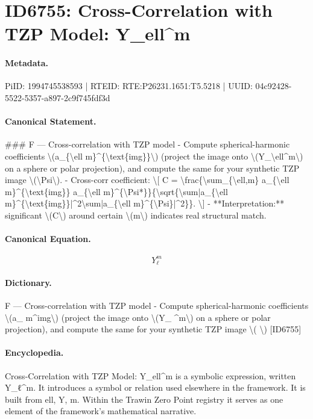 \section*{ID6755: Cross-Correlation with TZP Model: Y\_ell\textasciicircum{}m}
\paragraph{Metadata.}
PiID: 1994745538593 | RTEID: RTE:P26231.1651:T5.5218 | UUID: 04c92428-5522-5357-a897-2c9f745fdf3d

\paragraph{Canonical Statement.}
\#\#\# F — Cross-correlation with TZP model - Compute spherical-harmonic coefficients \textbackslash{}(a\_\{\textbackslash{}ell m\}\textasciicircum{}\{\textbackslash{}text\{img\}\}\textbackslash{}) (project the image onto \textbackslash{}(Y\_\textbackslash{}ell\textasciicircum{}m\textbackslash{}) on a sphere or polar projection), and compute the same for your synthetic TZP image \textbackslash{}(\textbackslash{}Psi\textbackslash{}). - Cross-corr coefficient: \textbackslash{}[ C = \textbackslash{}frac\{\textbackslash{}sum\_\{\textbackslash{}ell,m\} a\_\{\textbackslash{}ell m\}\textasciicircum{}\{\textbackslash{}text\{img\}\} a\_\{\textbackslash{}ell m\}\textasciicircum{}\{\textbackslash{}Psi*\}\}\{\textbackslash{}sqrt\{\textbackslash{}sum|a\_\{\textbackslash{}ell m\}\textasciicircum{}\{\textbackslash{}text\{img\}\}|\textasciicircum{}2\textbackslash{}sum|a\_\{\textbackslash{}ell m\}\textasciicircum{}\{\textbackslash{}Psi\}|\textasciicircum{}2\}\}. \textbackslash{}] - **Interpretation:** significant \textbackslash{}(C\textbackslash{}) around certain \textbackslash{}(m\textbackslash{}) indicates real structural match.

\paragraph{Canonical Equation.}
\[
Y_\ell^m
\]

\paragraph{Dictionary.}
F — Cross-correlation with TZP model - Compute spherical-harmonic coefficients \textbackslash{}(a\_ m\textasciicircum{}img\textbackslash{}) (project the image onto \textbackslash{}(Y\_ \textasciicircum{}m\textbackslash{}) on a sphere or polar projection), and compute the same for your synthetic TZP image \textbackslash{}( \textbackslash{}) [ID6755]

\paragraph{Encyclopedia.}
Cross-Correlation with TZP Model: Y\_ell\textasciicircum{}m is a symbolic expression, written Y\_ℓ\textasciicircum{}m. It introduces a symbol or relation used elsewhere in the framework. It is built from ell, Y, m. Within the Trawin Zero Point registry it serves as one element of the framework's mathematical narrative.
